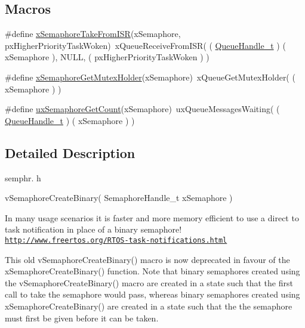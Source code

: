 \subsection*{Macros}
\begin{DoxyCompactItemize}
\item 
\#define \hyperlink{group___semaphores_ga076419b58e072655686939016e7ca3c5}{x\+Semaphore\+Take\+From\+I\+SR}(x\+Semaphore,  px\+Higher\+Priority\+Task\+Woken)~x\+Queue\+Receive\+From\+I\+SR( ( \hyperlink{group___queue_management_gaaf19d499892a4ce1409326ece00f5264}{Queue\+Handle\+\_\+t} ) ( x\+Semaphore ), N\+U\+LL, ( px\+Higher\+Priority\+Task\+Woken ) )
\item 
\#define \hyperlink{group___semaphores_ga7403bfbc06fb8449b2334f55d939a4c4}{x\+Semaphore\+Get\+Mutex\+Holder}(x\+Semaphore)~x\+Queue\+Get\+Mutex\+Holder( ( x\+Semaphore ) )
\item 
\#define \hyperlink{group___semaphores_gaa26a3d7cf9b5595a652daeb7f81229f3}{ux\+Semaphore\+Get\+Count}(x\+Semaphore)~ux\+Queue\+Messages\+Waiting( ( \hyperlink{group___queue_management_gaaf19d499892a4ce1409326ece00f5264}{Queue\+Handle\+\_\+t} ) ( x\+Semaphore ) )
\end{DoxyCompactItemize}


\subsection{Detailed Description}
semphr. h


\begin{DoxyPre}vSemaphoreCreateBinary( SemaphoreHandle\_t xSemaphore )\end{DoxyPre}


In many usage scenarios it is faster and more memory efficient to use a direct to task notification in place of a binary semaphore! \href{http://www.freertos.org/RTOS-task-notifications.html}{\tt http\+://www.\+freertos.\+org/\+R\+T\+O\+S-\/task-\/notifications.\+html}

This old v\+Semaphore\+Create\+Binary() macro is now deprecated in favour of the x\+Semaphore\+Create\+Binary() function. Note that binary semaphores created using the v\+Semaphore\+Create\+Binary() macro are created in a state such that the first call to \textquotesingle{}take\textquotesingle{} the semaphore would pass, whereas binary semaphores created using x\+Semaphore\+Create\+Binary() are created in a state such that the the semaphore must first be \textquotesingle{}given\textquotesingle{} before it can be \textquotesingle{}taken\textquotesingle{}.

